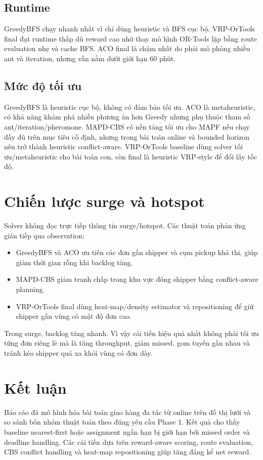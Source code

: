 \documentclass[conference]{IEEEtran}
\begin{document}
\subsection{Runtime}
GreedyBFS chạy nhanh nhất vì chỉ dùng heuristic và BFS cục bộ. VRP-OrTools final đạt runtime thấp dù reward cao nhờ thay mô hình OR-Tools lặp bằng route evaluation nhẹ và cache BFS. ACO final là chậm nhất do phải mô phỏng nhiều ant và iteration, nhưng vẫn nằm dưới giới hạn 60 phút.

\subsection{Mức độ tối ưu}
GreedyBFS là heuristic cục bộ, không có đảm bảo tối ưu. ACO là metaheuristic, có khả năng khám phá nhiều phương án hơn Greedy nhưng phụ thuộc tham số ant/iteration/pheromone. MAPD-CBS có nền tảng tối ưu cho MAPF nếu chạy đầy đủ trên mục tiêu cố định, nhưng trong bài toán online và bounded horizon nên trở thành heuristic conflict-aware. VRP-OrTools baseline dùng solver tối ưu/metaheuristic cho bài toán con, còn final là heuristic VRP-style để đổi lấy tốc độ.

\section{Chiến lược surge và hotspot}
Solver không đọc trực tiếp thông tin surge/hotspot. Các thuật toán phản ứng gián tiếp qua observation:
\begin{itemize}
    \item GreedyBFS và ACO ưu tiên các đơn gần shipper và cụm pickup khả thi, giúp giảm thời gian rỗng khi backlog tăng.
    \item MAPD-CBS giảm tranh chấp trong khu vực đông shipper bằng conflict-aware planning.
    \item VRP-OrTools final dùng heat-map/density estimator và repositioning để giữ shipper gần vùng có mật độ đơn cao.
\end{itemize}

Trong surge, backlog tăng nhanh. Vì vậy cải tiến hiệu quả nhất không phải tối ưu từng đơn riêng lẻ mà là tăng throughput, giảm missed, gom tuyến gần nhau và tránh kéo shipper quá xa khỏi vùng có đơn dày.

\section{Kết luận}
Báo cáo đã mô hình hóa bài toán giao hàng đa tác tử online trên đồ thị lưới và so sánh bốn nhóm thuật toán theo đúng yêu cầu Phase 1. Kết quả cho thấy baseline nearest-first hoặc assignment ngắn hạn bị giới hạn bởi missed order và deadline handling. Các cải tiến dựa trên reward-aware scoring, route evaluation, CBS conflict handling và heat-map repositioning giúp tăng đáng kể net reward.
\end{document}
